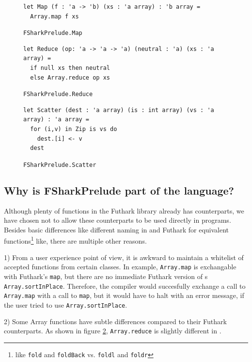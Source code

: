 \clearpage
\begin{figure}[H]
\centering
\begin{verbatim}
let Map (f : 'a -> 'b) (xs : 'a array) : 'b array =
  Array.map f xs
\end{verbatim}
\caption{\texttt{FSharkPrelude.Map}}
\label{fig:fsharkpreludemap}
\end{figure}

\begin{figure}[H]
\begin{verbatim}
let Reduce (op: 'a -> 'a -> 'a) (neutral : 'a) (xs : 'a array) =
  if null xs then neutral 
  else Array.reduce op xs
\end{verbatim}
\caption{\texttt{FSharkPrelude.Reduce}}
\label{fig:fsharkpreludereduce}
\end{figure}

\begin{figure}[H]
\begin{verbatim}
let Scatter (dest : 'a array) (is : int array) (vs : 'a array) : 'a array =
  for (i,v) in Zip is vs do
    dest.[i] <- v
  dest
\end{verbatim}
\caption{\texttt{FSharkPrelude.Scatter}}
\label{fig:fsharkpreludescatter}
\end{figure}
\clearpage

\subsection*{Why is FSharkPrelude part of the \fshark{} language?}
Although plenty of functions in the Futhark library already has \fsharp{}
counterparts, we have chosen not to allow these \fsharp{} counterparts to be
used directly in \fshark{} programs.
Besides basic differences like different naming in \fsharp{} and Futhark for
equivalent functions\footnote{like \texttt{fold} and \texttt{foldBack} vs.
  \texttt{foldl} and \texttt{foldr}} like, there are multiple other reasons.

1) From a user experience point of view, it is awkward to maintain a whitelist
of accepted functions from certain classes.
In example, \texttt{Array.map} is exchangable with Futhark's
\texttt{map}, but there are no immediate Futhark version of \fsharp{}s
\texttt{Array.sortInPlace}. Therefore, the \fshark{} compiler would succesfully
exchange a call to \texttt{Array.map} with a call to \texttt{map}, but it would
have to halt with an error message, if the user tried to use \texttt{Array.sortInPlace}.

2) Some Array functions have subtle differences compared to their
Futhark counterparts. As shown in figure \ref{fig:fsharkpreludereduce},
\texttt{Array.reduce} is slightly different in \fsharp{}.

